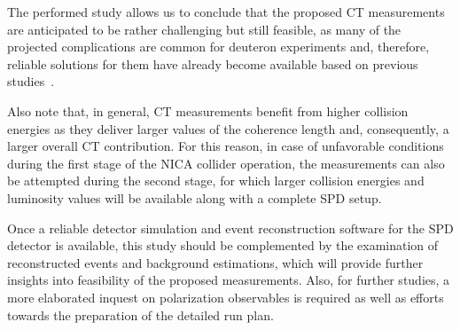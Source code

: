 The performed study allows us to conclude that the proposed CT measurements are anticipated to be rather challenging but still feasible, as many of the projected complications are common for deuteron experiments and, therefore, reliable solutions for them have already become available based on previous studies~\cite{CLAS:2023mfc,my_an_note:2020,my_thesis:2021,Skorodumina:2015rea, CLAS:2022kta,note_mm_distr}.

Also note that, in general, CT measurements benefit from higher collision energies as they deliver larger values of the coherence length and, consequently, a larger overall CT contribution. For this reason, in case of unfavorable conditions during the first stage of the NICA collider operation, the measurements can also be attempted during the second stage, for which larger collision energies and luminosity values will be available along with a complete SPD setup. 

Once a reliable detector simulation and event reconstruction software for the SPD detector is available, this study should be complemented by the examination of reconstructed events and background estimations, which will provide further insights into feasibility of the proposed measurements. Also, for further studies, a more elaborated inquest on polarization observables is required as well as efforts towards the preparation of the detailed run plan.





